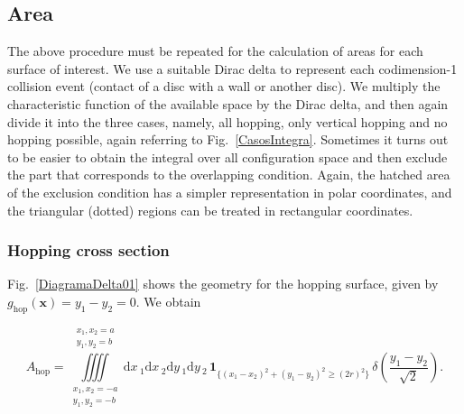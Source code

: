 \documentclass[superscriptaddress,pre,reprint,showpacs,twocolumn]{revtex4-1}
\newcommand{\rd}[1]{\mathrm{d}{#1} \,}
\newcommand{\indicatorsymbol}{\mathbf{1}}
\newcommand{\indicator}[1]{\indicatorsymbol_{ \{   #1 \} } }
\begin{document}
\subsection{Area}

The above procedure must be repeated for the calculation of 
areas for each surface of interest. We use a suitable Dirac delta to represent each codimension-1 collision
event (contact of a disc with a wall or another disc). We multiply the characteristic function of the available space by the Dirac delta, and
then again divide it into the three cases, namely, all hopping, only vertical hopping
and no hopping possible, again referring to Fig.~\ref{CasosIntegra}.
Sometimes it turns out to be easier to obtain 
the integral  over all configuration space and then exclude the part that
corresponds to the overlapping condition. Again, the hatched area of the exclusion
condition has a simpler representation in polar coordinates, and the triangular
(dotted) regions can be treated in rectangular coordinates.
%

\subsubsection{Hopping cross section}

Fig.~\ref{DiagramaDelta01} shows the geometry for the hopping surface,
given by $g_\text{hop}(\mathbf{x}) = y_1 - y_2 = 0$. We obtain

\begin{widetext}\label{ahopcart}
\begin{equation}
  A_\text{hop} =
\iiiint
\limits_{\substack{x_1, x_2 = -a \\ y_1, y_2 = -b}}^{\substack{x_1, x_2 = a \\ y_1, y_2 = b}}
\rd x_1 \rd x_2 \rd y_1 \rd y_2 
 \, \indicator{ (x_1-x_2)^2 + (y_1-y_2)^2 \ge (2r)^2 } \, \delta \left( \frac{y_1-y_2}{\sqrt{2}} \right).
\end{equation}
\end{widetext}
\end{document}

